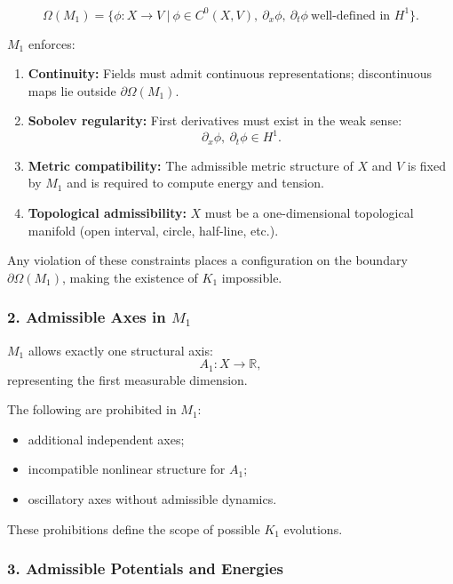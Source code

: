 \[
\Omega(M_1)
=
\Big\{
\phi : X \to V \ \big|\
\phi \in C^{0}(X,V),\ 
\partial_x \phi,\ \partial_t \phi\ \text{well-defined in } H^1
\Big\}.
\]

$M_1$ enforces:

\begin{enumerate}
    \item \textbf{Continuity:}  
    Fields must admit continuous representations; discontinuous maps lie outside $\partial\Omega(M_1)$.

    \item \textbf{Sobolev regularity:}  
    First derivatives must exist in the weak sense:
    \[
    \partial_x \phi,\ \partial_t \phi \in H^1.
    \]

    \item \textbf{Metric compatibility:}  
    The admissible metric structure of $X$ and $V$ is fixed by $M_1$ and is required to compute energy and tension.

    \item \textbf{Topological admissibility:}  
    $X$ must be a one-dimensional topological manifold
    (open interval, circle, half-line, etc.).
\end{enumerate}

Any violation of these constraints places a configuration on the boundary
$\partial\Omega(M_1)$, making the existence of $K_1$ impossible.

\subsubsection*{2. Admissible Axes in \texorpdfstring{$M_1$}{M_1}}

$M_1$ allows exactly one structural axis:
\[
A_1 : X \to \mathbb{R},
\]
representing the first measurable dimension.

The following are prohibited in $M_1$:

\begin{itemize}
    \item additional independent axes;
    \item incompatible nonlinear structure for $A_1$;
    \item oscillatory axes without admissible dynamics.
\end{itemize}

These prohibitions define the scope of possible $K_1$ evolutions.

\subsubsection*{3. Admissible Potentials and Energies}

